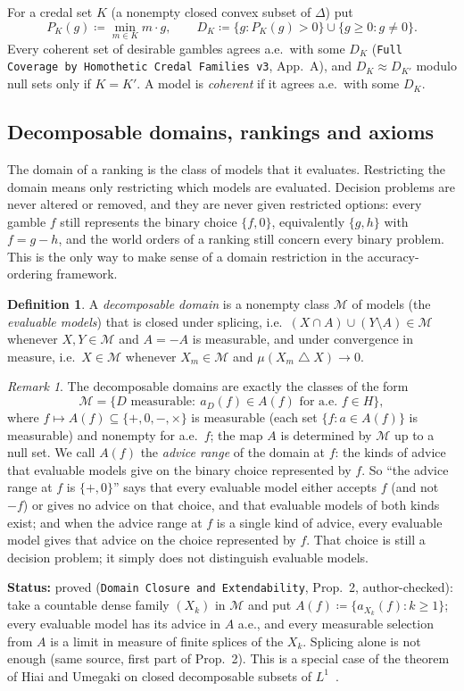 \documentclass[11pt]{article}
\theoremstyle{definition}
\newtheorem{definition}[theorem]{Definition}
\theoremstyle{remark}
\newtheorem{remark}[theorem]{Remark}
\newcommand{\M}{\mathcal M}
\newcommand{\sd}{\mathbin{\triangle}}
\newcommand{\src}[1]{\texttt{#1}}
\newcommand{\status}[1]{\par\smallskip\noindent\textbf{Status:} #1\par\smallskip}
\begin{document}
For a credal set $K$ (a nonempty closed convex subset of $\Delta$) put
\[
P_K(g)\coloneqq\min_{m\in K}m\cdot g,\qquad D_K\coloneqq\{g:P_K(g)>0\}\cup\{g\ge0:g\ne0\}.
\]
Every coherent set of desirable gambles agrees a.e.\ with some $D_K$ (\src{Full Coverage by Homothetic Credal Families v3}, App.~A), and $D_K\approx D_{K'}$ modulo null sets only if $K=K'$. A model is \emph{coherent} if it agrees a.e.\ with some $D_K$.

\subsection{Decomposable domains, rankings and axioms}
The domain of a ranking is the class of models that it evaluates. Restricting the domain means only restricting which models are evaluated. Decision problems are never altered or removed, and they are never given restricted options: every gamble $f$ still represents the binary choice $\{f,0\}$, equivalently $\{g,h\}$ with $f=g-h$, and the world orders of a ranking still concern every binary problem. This is the only way to make sense of a domain restriction in the accuracy-ordering framework.

\begin{definition}\label{def:domain}
A \emph{decomposable domain} is a nonempty class $\M$ of models (the \emph{evaluable models}) that is closed under splicing, i.e.\ $(X\cap A)\cup(Y\setminus A)\in\M$ whenever $X,Y\in\M$ and $A=-A$ is measurable, and under convergence in measure, i.e.\ $X\in\M$ whenever $X_m\in\M$ and $\mu(X_m\sd X)\to0$.
\end{definition}

\begin{remark}\label{rem:advicerange}
The decomposable domains are exactly the classes of the form
\[
\M=\{D\text{ measurable}:\ a_D(f)\in A(f)\text{ for a.e.\ }f\in H\},
\]
where $f\mapsto A(f)\subseteq\{+,0,-,\times\}$ is measurable (each set $\{f:a\in A(f)\}$ is measurable) and nonempty for a.e.\ $f$; the map $A$ is determined by $\M$ up to a null set. We call $A(f)$ the \emph{advice range} of the domain at $f$: the kinds of advice that evaluable models give on the binary choice represented by $f$. So ``the advice range at $f$ is $\{+,0\}$'' says that every evaluable model either accepts $f$ (and not $-f$) or gives no advice on that choice, and that evaluable models of both kinds exist; and when the advice range at $f$ is a single kind of advice, every evaluable model gives that advice on the choice represented by $f$. That choice is still a decision problem; it simply does not distinguish evaluable models.
\end{remark}
\status{proved (\src{Domain Closure and Extendability}, Prop.~2, author-checked): take a countable dense family $(X_k)$ in $\M$ and put $A(f)\coloneqq\{a_{X_k}(f):k\ge1\}$; every evaluable model has its advice in $A$ a.e., and every measurable selection from $A$ is a limit in measure of finite splices of the $X_k$. Splicing alone is not enough (same source, first part of Prop.~2). This is a special case of the theorem of Hiai and Umegaki on closed decomposable subsets of $L^1$~\cite{HU1977}.}
\end{document}
